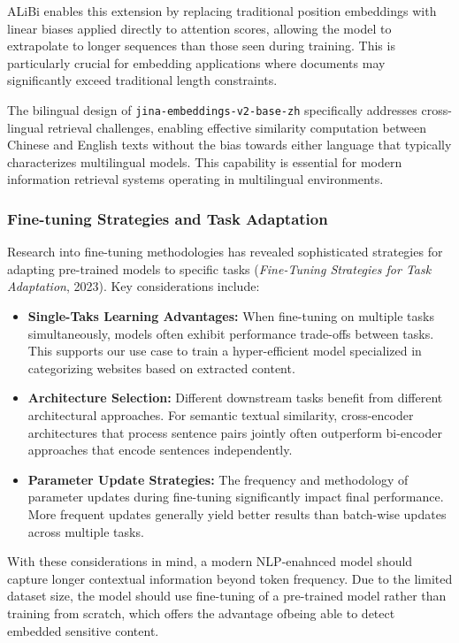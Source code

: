 \documentclass[
  titlepage]{article}
\begin{document}
ALiBi enables this extension by replacing traditional position
embeddings with linear biases applied directly to attention scores,
allowing the model to extrapolate to longer sequences than those seen
during training. This is particularly crucial for embedding applications
where documents may significantly exceed traditional length constraints.

The bilingual design of \texttt{jina-embeddings-v2-base-zh} specifically
addresses cross-lingual retrieval challenges, enabling effective
similarity computation between Chinese and English texts without the
bias towards either language that typically characterizes multilingual
models. This capability is essential for modern information retrieval
systems operating in multilingual environments.

\subsubsection{Fine-tuning Strategies and Task
Adaptation}\label{fine-tuning-strategies-and-task-adaptation}

Research into fine-tuning methodologies has revealed sophisticated
strategies for adapting pre-trained models to specific tasks
(\emph{Fine-Tuning Strategies for Task Adaptation}, 2023). Key
considerations include:

\begin{itemize}
\item
  \textbf{Single-Taks Learning Advantages:} When fine-tuning on multiple
  tasks simultaneously, models often exhibit performance trade-offs
  between tasks. This supports our use case to train a hyper-efficient
  model specialized in categorizing websites based on extracted content.
\item
  \textbf{Architecture Selection:} Different downstream tasks benefit
  from different architectural approaches. For semantic textual
  similarity, cross-encoder architectures that process sentence pairs
  jointly often outperform bi-encoder approaches that encode sentences
  independently.
\item
  \textbf{Parameter Update Strategies:} The frequency and methodology of
  parameter updates during fine-tuning significantly impact final
  performance. More frequent updates generally yield better results than
  batch-wise updates across multiple tasks.
\end{itemize}

With these considerations in mind, a modern NLP-enahnced model should
capture longer contextual information beyond token frequency. Due to the
limited dataset size, the model should use fine-tuning of a pre-trained
model rather than training from scratch, which offers the advantage
ofbeing able to detect embedded sensitive content.
\end{document}
